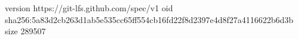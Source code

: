version https://git-lfs.github.com/spec/v1
oid sha256:5a83d2cb263d1ab5e535cc65ff554cb16fd22f8d2397e4d8f27a4116622b6d3b
size 289507
